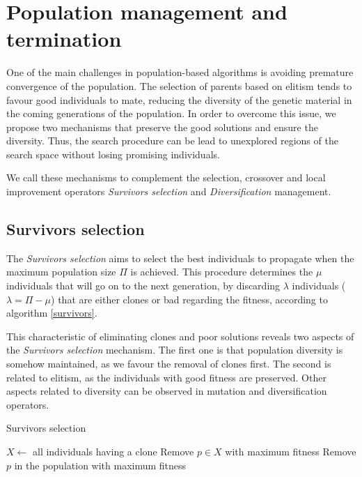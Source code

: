 \section{Population management and termination}
One of the main challenges in population-based algorithms is avoiding premature convergence of the population. The selection of parents based on elitism tends to favour good individuals to mate, reducing the diversity of the genetic material in the coming generations of the population. In order to overcome this issue, we propose two mechanisms that preserve the good solutions and ensure the diversity. Thus, the search procedure can be lead to unexplored regions of the search space without losing promising individuals.

We call these mechanisms to complement the selection, crossover and local improvement operators \textit{Survivors selection} and \textit{Diversification} management.

\subsection{Survivors selection}
The \textit{Survivors selection} aims to select the best individuals to propagate when the maximum population size $\Pi$ is achieved. This procedure determines the $\mu$ individuals that will go on to the next generation, by discarding $\lambda$ individuals ($\lambda = \Pi - \mu$) that are either clones or bad regarding the fitness, according to algorithm \ref{survivors}.

This characteristic of eliminating clones and poor solutions reveals two aspects of the \textit{Survivors selection} mechanism. The first one is that population diversity is somehow maintained, as we favour the removal of clones first. The second is related to elitism, as the individuals with good fitness are preserved. Other aspects related to diversity can be observed in mutation and diversification operators.

\begin{algorithm}[H]
\caption{Survivors selection}
\label{survivors}
\begin{algorithmic}[1]
\STATE $X \leftarrow $ all individuals having a clone
\STATE Remove $p \in X$ with maximum fitness
\ELSE
\STATE Remove $p$ in the population with maximum fitness
\ENDIF
\ENDFOR
\end{algorithmic}
\end{algorithm}

